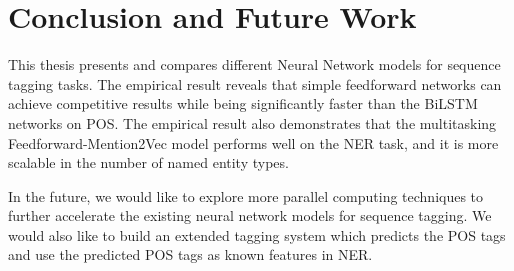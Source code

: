 \documentclass{sfuthesis}
\begin{document}
\chapter{Conclusion and Future Work}

This thesis presents and compares different Neural Network models for sequence tagging tasks. The empirical result reveals that simple feedforward networks can achieve competitive results while being significantly faster than the BiLSTM networks on POS. The empirical result also demonstrates that the multitasking Feedforward-Mention2Vec model performs well on the NER task, and it is more scalable in the number of named entity types.

In the future, we would like to explore more parallel computing techniques to further accelerate the existing neural network models for sequence tagging. We would also like to build an extended tagging system which predicts the POS tags and use the predicted POS tags as known features in NER.


%
%
%
%
%

\cleardoublepage
{}
{}
%


	

\end{document}
